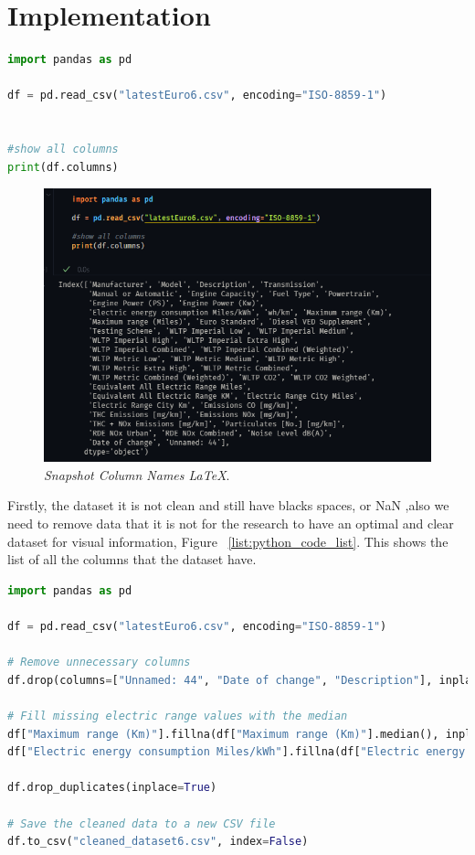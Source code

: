 \section{Implementation}
\begin{lstlisting}[language=Python, caption={Code snippet in \LaTeX ~and  this is a Python code }, label=list:python_code_ex]
import pandas as pd

df = pd.read_csv("latestEuro6.csv", encoding="ISO-8859-1")


#show all columns
print(df.columns)
\end{lstlisting}
\begin{figure}[H]
    \centering
    \includegraphics[scale=0.85]{figures/ColumnNames.png}
    \caption{\textit{Snapshot Column Names \LaTeX}.}
    \label{fig:chart_3}
\end{figure}

\clearpage

Firstly, the dataset it is not clean and still have blacks spaces, or NaN ,also we need to remove data that it is not for the research to have an optimal and clear dataset for visual information, Figure ~\ref{list:python_code_list}. This shows the list of all the columns that the dataset have.

\begin{lstlisting}[language=Python, caption={Code snippet in \LaTeX ~and  this is a Python code, removind unnesesary data }, label=list:python_code_list]
import pandas as pd

df = pd.read_csv("latestEuro6.csv", encoding="ISO-8859-1")

# Remove unnecessary columns
df.drop(columns=["Unnamed: 44", "Date of change", "Description"], inplace=True)

# Fill missing electric range values with the median
df["Maximum range (Km)"].fillna(df["Maximum range (Km)"].median(), inplace=True)
df["Electric energy consumption Miles/kWh"].fillna(df["Electric energy consumption Miles/kWh"].median(), inplace=True)

df.drop_duplicates(inplace=True)

# Save the cleaned data to a new CSV file
df.to_csv("cleaned_dataset6.csv", index=False)

\end{lstlisting}

